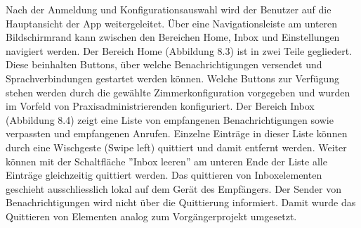 Nach der Anmeldung und Konfigurationsauswahl wird der Benutzer auf die Hauptansicht der App weitergeleitet.
Über eine Navigationsleiste am unteren Bildschirmrand kann zwischen den Bereichen Home, Inbox und Einstellungen navigiert werden.
Der Bereich Home (Abbildung 8.3) ist in zwei Teile gegliedert.
Diese beinhalten Buttons, über welche Benachrichtigungen versendet und Sprachverbindungen gestartet werden können.
Welche Buttons zur Verfügung stehen werden durch die gewählte Zimmerkonfiguration vorgegeben und wurden im Vorfeld von Praxisadministrierenden konfiguriert.
Der Bereich Inbox (Abbildung 8.4) zeigt eine Liste von empfangenen Benachrichtigungen sowie verpassten und empfangenen Anrufen.
Einzelne Einträge in dieser Liste können durch eine Wischgeste (Swipe left) quittiert und damit entfernt werden.
Weiter können mit der Schaltfläche ''Inbox leeren'' am unteren Ende der Liste alle Einträge gleichzeitig quittiert werden.
Das quittieren von Inboxelementen geschieht ausschliesslich lokal auf dem Gerät des Empfängers.
Der Sender von Benachrichtigungen wird nicht über die Quittierung informiert.
Damit wurde das Quittieren von Elementen analog zum Vorgängerprojekt umgesetzt.

